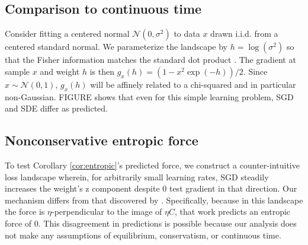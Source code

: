 \documentclass{article}
\theoremstyle{plain}
\theoremstyle{definition}
\newcommand{\Nn}{\mathcal{N}}   \newcommand{\NN}{\mathbb{N}}
\newcommand{\sizeddia}[2]{
    \begin{gathered}
        \texttt{[image: ../diagrams/\#1.png]}
    \end{gathered}
}
\newcommand{\sdia}[1]{\protect \sizeddia{#1}{0.10}}
\begin{document}
    \subsection{Comparison to continuous time} \label{subsect:gaussfit}
        Consider fitting a centered normal $\Nn(0, \sigma^2)$ to data $x$ drawn 
        i.i.d. from a centered standard normal.  We parameterize the landscape
        by $h=\log(\sigma^2)$ so that the Fisher information matches the
        standard dot product \citep{am98}.  The gradient at sample $x$ and
        weight $h$ is then $g_x(h) = (1-x^2\exp(-h))/2$.  Since $x\sim
        \Nn(0, 1)$, $g_x(h)$ will be affinely related to a chi-squared and in
        particular non-Gaussian.
        {\color{red} FIGURE} shows that even for this simple learning problem, 
        SGD and SDE differ as predicted.


    \subsection{Nonconservative entropic force} \label{subsect:entropic}
        To test Corollary \ref{cor:entropic}'s predicted force, we construct a
        counter-intuitive loss landscape wherein, for arbitrarily small
        learning rates, SGD steadily increases the weight's z component despite
        0 test gradient in that direction.  Our mechanism differs from that
        discovered by \citet{ch18}.  Specifically, because in this landscape
        the force is $\eta$-perpendicular to the image of $\eta C$, that work
        predicts an entropic force of $0$.  This disagreement in predictions is
        possible because our analysis does not make any assumptions of
        equilibrium, conservatism, or continuous time.
       
\end{document}
